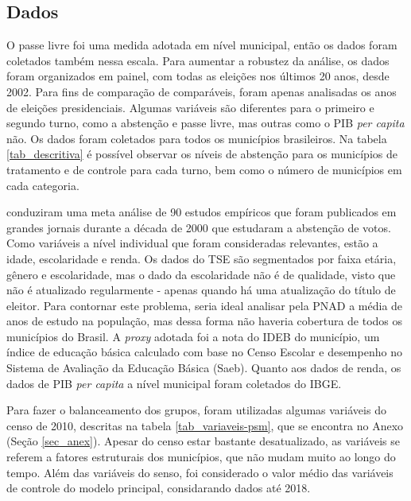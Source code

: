 \subsection{Dados}

O passe livre foi uma medida adotada em nível municipal, então os dados foram coletados também nessa escala. Para aumentar a robustez da análise, os dados foram organizados em painel, com todas as eleições nos últimos 20 anos, desde 2002. Para fins de comparação de comparáveis, foram apenas analisadas os anos de eleições presidenciais. Algumas variáveis são diferentes para o primeiro e segundo turno, como a abstenção e passe livre, mas outras como o PIB \textit{per capita} não. Os dados foram coletados para todos os municípios brasileiros. Na tabela \ref{tab_descritiva} é possível observar os níveis de abstenção para os municípios de tratamento e de controle para cada turno, bem como o número de municípios em cada categoria.



\textcite{smets2013embarrassment} conduziram uma meta análise de 90 estudos empíricos que foram publicados em grandes jornais durante a década de 2000 que estudaram a abstenção de votos. Como variáveis a nível individual que foram consideradas relevantes, estão a idade, escolaridade e renda. Os dados do TSE são segmentados por faixa etária, gênero e escolaridade, mas o dado da escolaridade não é de qualidade, visto que não é atualizado regularmente - apenas quando há uma atualização do título de eleitor. Para contornar este problema, seria ideal analisar pela PNAD a média de anos de estudo na população, mas dessa forma não haveria cobertura de todos os municípios do Brasil. A \textit{proxy} adotada foi a nota do IDEB do município, um índice de educação básica calculado com base no Censo Escolar e desempenho no Sistema de Avaliação da Educação Básica (Saeb). Quanto aos dados de renda, os dados de PIB \textit{per capita} a nível municipal foram coletados do IBGE.

Para fazer o balanceamento dos grupos, foram utilizadas algumas variáveis do censo de 2010, descritas na tabela \ref{tab_variaveis-psm}, que se encontra no Anexo (Seção \ref{sec_anex}). Apesar do censo estar bastante desatualizado, as variáveis se referem a fatores estruturais dos municípios, que não mudam muito ao longo do tempo. Além das variáveis do senso, foi considerado o valor médio das variáveis de controle do modelo principal, considarando dados até 2018.

